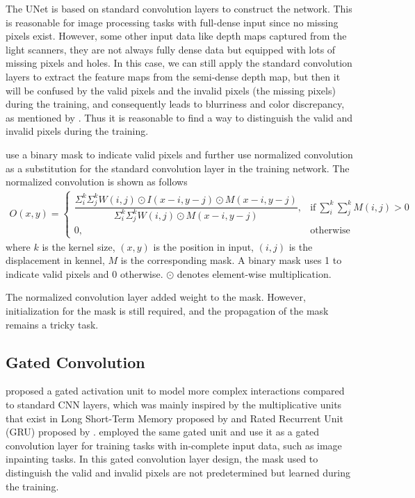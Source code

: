 The UNet is based on standard convolution layers to construct the network. This is reasonable for image processing tasks with full-dense input since no missing pixels exist. 
However, some other input data like depth maps captured from the light scanners, they are not always fully dense data but equipped with lots of missing pixels and holes. In this case, we can still apply the standard convolution layers to extract the feature maps from the semi-dense depth map, but then it will be confused by the valid pixels and the invalid pixels (the missing pixels) during the training, and consequently leads to blurriness and color discrepancy, as mentioned by \cite{partial_conv}. Thus it is reasonable to find a way to distinguish the valid and invalid pixels during the training. 


\cite{pncnn0} use a binary mask to indicate valid pixels and further use normalized convolution as a substitution for the standard convolution layer in the training network. The normalized convolution is shown as follows
\begin{equation}
	\begin{array}{rrclcl}
		O(x,y) = 
		\begin{cases}
			\dfrac{\Sigma_i^k\Sigma_j^k W(i,j) \odot I(x-i,y-j) \odot M(x-i,y-j)}{\Sigma_i^k\Sigma_j^k W(i,j) \odot M(x-i,y-j)}, & \text{if}\ \sum_{i}^k\sum_{j}^k M(i,j)>0 \\
			0, & \text{otherwise}
		\end{cases}
	\end{array}
\end{equation}
where $ k $ is the kernel size, $ (x,y) $ is the position in input, $ (i,j) $ is the displacement in kennel, $ M $ is the corresponding mask. A binary mask uses 1 to indicate valid pixels and 0 otherwise. $ \odot $ denotes element-wise multiplication.

The normalized convolution layer added weight to the mask. However, initialization for the mask is still required, and the propagation of the mask remains a tricky task. 
\subsection{Gated Convolution}

\cite{gated_activation} proposed a gated activation unit to model more complex interactions compared to standard CNN layers, which was mainly inspired by the multiplicative units that exist in Long Short-Term Memory proposed by \cite{lstm} and Rated Recurrent Unit (GRU) proposed by \cite{gru}. \cite{gconv} employed the same gated unit and use it as a gated convolution layer for training tasks with in-complete input data, such as image inpainting tasks. In this gated convolution layer design, the mask used to distinguish the valid and invalid pixels are not predetermined but learned during the training. 

